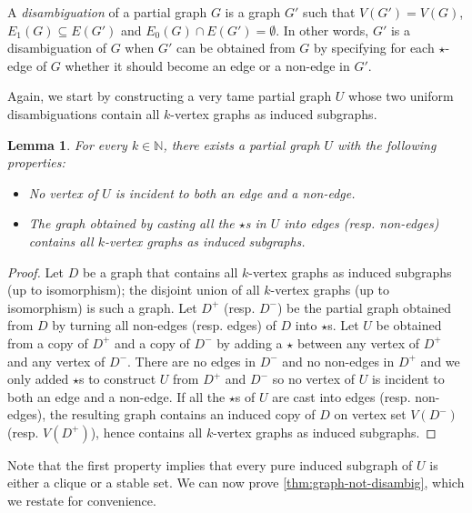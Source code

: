 \documentclass[11pt]{article}
\newtheorem{lemma}[theorem]{Lemma}
\theoremstyle{remark}
\begin{document}
A \emph{disambiguation} of a partial graph $G$ is a graph $G'$ such that $V(G') = V(G)$, $E_1(G) \subseteq E(G')$ and $E_0(G) \cap E(G') = \emptyset$.
In other words, $G'$ is a disambiguation of $G$ when $G'$ can be obtained from $G$ by specifying for each $\star$-edge of $G$ whether it should become an edge or a non-edge in $G'$.

Again, we start by constructing a very tame partial graph $U$ whose two uniform disambiguations contain all $k$-vertex graphs as induced subgraphs.

\begin{lemma}\label{lem:universal-graph-simple}
    For every $k \in \mathbb{N}$, there exists a partial graph $U$ with the following properties: \begin{itemize}
        \item No vertex of $U$ is incident to both an edge and a non-edge.
        \item The graph obtained by casting all the $\star$s in $U$ into edges (resp. non-edges) contains all $k$-vertex graphs as induced subgraphs.
    \end{itemize}
\end{lemma}

\begin{proof}
    Let $D$ be a graph that contains all $k$-vertex graphs as induced subgraphs (up to isomorphism); the disjoint union of all $k$-vertex graphs (up to isomorphism) is such a graph.
    Let $D^+$ (resp. $D^-$) be the partial graph obtained from $D$ by turning all non-edges (resp. edges) of $D$ into $\star$s.
    Let $U$ be obtained from a copy of $D^+$ and a copy of $D^-$ by adding a $\star$ between any vertex of $D^+$ and any vertex of $D^-$.
    There are no edges in $D^-$ and no non-edges in $D^+$ and we only added $\star$s to construct $U$ from $D^+$ and $D^-$ so no vertex of $U$ is incident to both an edge and a non-edge.
    If all the $\star$s of $U$ are cast into edges (resp. non-edges), the resulting graph contains an induced copy of $D$ on vertex set $V(D^-)$ (resp. $V(D^+)$), hence contains all $k$-vertex graphs as induced subgraphs.
\end{proof}

Note that the first property implies that every pure induced subgraph of $U$ is either a clique or a stable set.
We can now prove \cref{thm:graph-not-disambig}, which we restate for convenience.

\maingraph*
\end{document}
